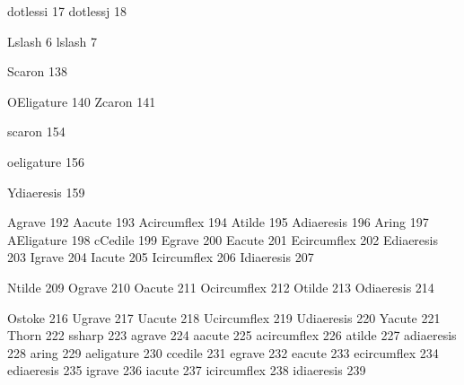  dotlessi           17
 dotlessj           18

 Lslash              6
 lslash              7

 Scaron            138

 OEligature        140
 Zcaron            141

 scaron            154

 oeligature        156

 Ydiaeresis        159

 Agrave            192
 Aacute            193
 Acircumflex       194
 Atilde            195
 Adiaeresis        196      
 Aring             197
 AEligature        198
 cCedile           199
 Egrave            200
 Eacute            201
 Ecircumflex       202
 Ediaeresis        203
 Igrave            204
 Iacute            205
 Icircumflex       206
 Idiaeresis        207

 Ntilde            209
 Ograve            210
 Oacute            211
 Ocircumflex       212
 Otilde            213
 Odiaeresis        214

 Ostoke            216
 Ugrave            217
 Uacute            218
 Ucircumflex       219
 Udiaeresis        220
 Yacute            221
 Thorn             222
 ssharp            223
 agrave            224
 aacute            225
 acircumflex       226
 atilde            227
 adiaeresis        228      
 aring             229
 aeligature        230
 ccedile           231
 egrave            232
 eacute            233
 ecircumflex       234
 ediaeresis        235      
 igrave            236
 iacute            237
 icircumflex       238
 idiaeresis        239

